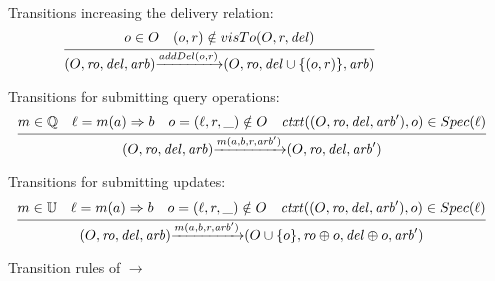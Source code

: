 \begin{figure}[ht]
Transitions increasing the delivery relation:
\[
\begin{array}{l c}
\bigfrac{ o \in O\quad (o,r)\notin visTo(O,r,\mathit{del}) }
{ (O,\mathit{ro},\mathit{del},\mathit{arb}) {\xrightarrow{addDel(o,r)}} (O,\mathit{ro},\mathit{del} \cup \{ (o,r) \},\mathit{arb}) } %
\end{array}
\]


Transitions for submitting query operations:
\[
\begin{array}{l c}
\bigfrac{ m \in \mathbb{Q}\quad \ell = m(a) \Rightarrow b\quad o=(\ell,r,\_) \notin O\quad {\mathit{ctxt}}((O,\mathit{ro},\mathit{del},\mathit{arb}'),o) \in Spec(\ell) }
{ (O,\mathit{ro},\mathit{del},\mathit{arb}) {\xrightarrow{m(a,b,r,\mathit{arb}')}} (O,\mathit{ro},\mathit{del},\mathit{arb}') } %
\end{array}
\]


Transitions for submitting updates:
\[
\begin{array}{l c}
\bigfrac{ m \in \mathbb{U}\quad \ell = m(a) \Rightarrow b\quad o = (\ell,r,\_) \notin O\quad {\mathit{ctxt}}((O,\mathit{ro},\mathit{del},\mathit{arb}'),o) \in Spec(\ell) }
{ (O,\mathit{ro},\mathit{del},\mathit{arb}) {\xrightarrow{m(a,b,r,\mathit{arb}')}} (O \cup \{ o \},\mathit{ro} \oplus o ,\mathit{del} \oplus o,\mathit{arb}') } %
\end{array}
\]

\caption{Transition rules of $\rightarrow$}
\label{fig:transition rules of RImpSpec}
\end{figure}

